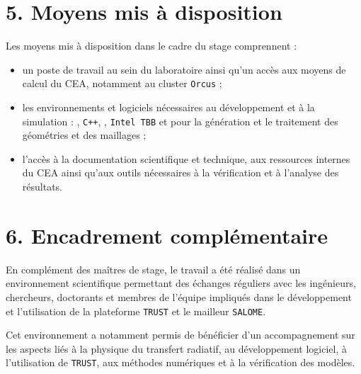 
\section*{5. Moyens mis à disposition}

Les moyens mis à disposition dans le cadre du stage comprennent :

\begin{itemize}[leftmargin=1.5cm]

    \item un poste de travail au sein du laboratoire ainsi qu'un
    accès aux moyens de calcul du CEA, notamment au cluster
    \texttt{Orcus} ;

    \item les environnements et logiciels nécessaires au
    développement et à la simulation : \trust, \texttt{C++},
    \emb, \texttt{Intel TBB} et \salome
    pour la génération et le traitement des géométries et des
    maillages ;

    \item l'accès à la documentation scientifique et technique,
    aux ressources internes du CEA ainsi qu'aux outils nécessaires
    à la vérification et à l'analyse des résultats.

\end{itemize}



\section*{6. Encadrement complémentaire}

En complément des maîtres de stage, le travail a été réalisé dans
un environnement scientifique permettant des échanges réguliers
avec les ingénieurs, chercheurs, doctorants et membres de l'équipe
impliqués dans le développement et l'utilisation de la plateforme
\texttt{TRUST} et le mailleur \texttt{SALOME}.

Cet environnement a notamment permis de bénéficier d'un
accompagnement sur les aspects liés à la physique du transfert
radiatif, au développement logiciel, à l'utilisation de
\texttt{TRUST}, aux méthodes numériques et à la vérification
des modèles.

